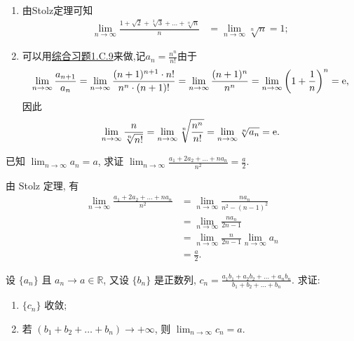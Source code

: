 \begin{solution}
    \begin{enumerate}
        \item 由Stolz定理可知
              \begin{align*}
                  \lim_{n \to \infty} \frac{1+\sqrt{2}+\sqrt[3]{3}+\dots+\sqrt[n]{n}}{n} &= \lim_{n \to \infty} \sqrt[n]{n} = 1;
              \end{align*}
        \item 可以用\hyperref[exe:1.C.9]{综合习题1.C.9}来做,记$a_n=\frac{n^n}{n!}$由于
        $$\lim_{n\to\infty}\frac{a_{n+1}}{a_n}=\lim_{n\to\infty}\frac{(n+1)^{n+1}\cdot n!}{n^n\cdot (n+1)!}=\lim_{n\to\infty}\frac{(n+1)^{n}}{n^n}=\lim_{n\to\infty}\left(1+\frac{1}{n}\right)^{n}=\mathrm{e},$$
        因此$$\lim_{n \to \infty} \frac{n}{\sqrt[n]{n!}}=\lim_{n \to \infty}\sqrt[n]{\frac{n^n}{n!}}=\lim_{n \to \infty}\sqrt[n]{a_n}=\mathrm{e}.$$
    \end{enumerate}
\end{solution}

\begin{exercise}[1.C.11]
    已知 $\lim_{n \to \infty} a_n = a$, 求证 $\lim_{n \to \infty} \frac{a_1+2a_2+\dots+na_n}{n^2} = \frac{a}{2}$.
\end{exercise}
\begin{solution}
    由 Stolz 定理, 有
    \begin{align*}
        \lim_{n \to \infty} \frac{a_1+2a_2+\dots+na_n}{n^2} &= \lim_{n \to \infty} \frac{na_n}{n^2 - (n-1)^2} \\
        &= \lim_{n \to \infty} \frac{na_n}{2n-1}\\
        & =\lim_{n \to \infty}\frac{n}{2n-1} \lim_{n \to \infty} a_n \\ 
        &= \frac{a}{2}.
    \end{align*}
\end{solution}

\begin{exercise}[1.C.12]
    设 $\{a_n\}$ 且 $a_n \to a \in \mathbb{R}$, 又设 $\{b_n\}$ 是正数列, $c_n = \frac{a_1b_1+a_2b_2+\dots+a_nb_n}{b_1+b_2+\dots+b_n}$. 求证:
    \begin{enumerate}
        \item $\{c_n\}$ 收敛;
        \item 若 $(b_1+b_2+\dots+b_n) \to +\infty$, 则 $\lim_{n \to \infty} c_n = a$.
    \end{enumerate}
\end{exercise}

